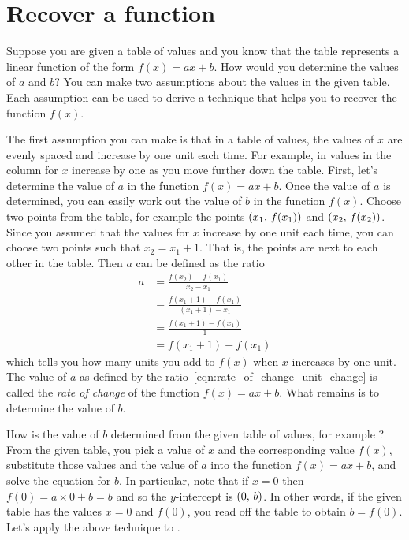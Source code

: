 \documentclass[a4paper,oneside,12pt]{article}
\begin{document}

\section{Recover a function}

Suppose you are given a table of values and you know that the table
represents a linear function of the form $f(x) = ax + b$.  How would
you determine the values of $a$ and $b$?  You can make two assumptions
about the values in the given table.  Each assumption can be used to
derive a technique that helps you to recover the function $f(x)$.

The first assumption you can make is that in a table of values, the
values of $x$ are evenly spaced and increase by one unit each time.
For example, in  values in
the column for $x$ increase by one as you move further down the table.
First, let's determine the value of $a$ in the function $f(x) = ax +
b$.  Once the value of $a$ is determined, you can easily work out the
value of $b$ in the function $f(x)$.  Choose two points from the
table, for example the points $\left\lparen{x_1},\, {f(x_1)}\right\rparen$ and
$\left\lparen{x_2},\, {f(x_2)}\right\rparen$.  Since you assumed that the values for $x$
increase by one unit each time, you can choose two points such that
$x_2 = x_1 + 1$.  That is, the points are next to each other in the
table.  Then $a$ can be defined as the ratio
\begin{equation}
\label{eqn:rate_of_change_unit_change}
\begin{aligned}
a
&=
\frac{
  f(x_2) - f(x_1)
}{
  x_2 - x_1
} \\[4pt]
&=
\frac{
  f(x_1 + 1) - f(x_1)
}{
  (x_1 + 1) - x_1
} \\[4pt]
&=
\frac{
  f(x_1 + 1) - f(x_1)
}{
  1
} \\[4pt]
&=
f(x_1 + 1) - f(x_1)
\end{aligned}
\end{equation}
which tells you how many units you add to $f(x)$ when $x$ increases by
one unit.  The value of $a$ as defined by the
ratio~\eqref{eqn:rate_of_change_unit_change} is called the
\emph{rate of change} of the function $f(x) = ax + b$.  What remains
is to determine the value of $b$.

How is the value of $b$ determined from the given table of values, for
example ?  From the given
table, you pick a value of $x$ and the corresponding value $f(x)$,
substitute those values and the value of $a$ into the function
$f(x) = ax + b$, and solve the equation for $b$.  In particular, note
that if $x = 0$ then $f(0) = a \times 0 + b = b$ and so the
$y$-intercept is $\left\lparen{0},\, {b}\right\rparen$.  In other words, if the given table
has the values $x = 0$ and $f(0)$, you read off the table to obtain
$b = f(0)$.  Let's apply the above technique to
.
\end{document}
